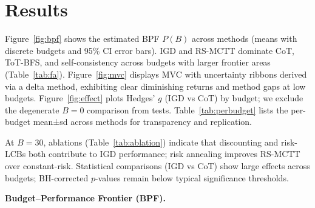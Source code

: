 \section{Results}

Figure~\ref{fig:bpf} shows the estimated BPF $P(B)$ across methods (means with discrete budgets and 95\% CI error bars). IGD and RS-MCTT dominate CoT, ToT-BFS, and self-consistency across budgets with larger frontier areas (Table~\ref{tab:fa}). Figure~\ref{fig:mvc} displays MVC with uncertainty ribbons derived via a delta method, exhibiting clear diminishing returns and method gaps at low budgets. Figure~\ref{fig:effect} plots Hedges’ $g$ (IGD vs CoT) by budget; we exclude the degenerate $B{=}0$ comparison from tests. Table~\ref{tab:perbudget} lists the per-budget mean±sd across methods for transparency and replication.

At $B=30$, ablations (Table~\ref{tab:ablation}) indicate that discounting and risk-LCBs both contribute to IGD performance; risk annealing improves RS-MCTT over constant-risk. Statistical comparisons (IGD vs CoT) show large effects across budgets; BH-corrected $p$-values remain below typical significance thresholds.

\vspace{0.5em}
\noindent
\textbf{Budget--Performance Frontier (BPF).}
\vspace{0.25em}

